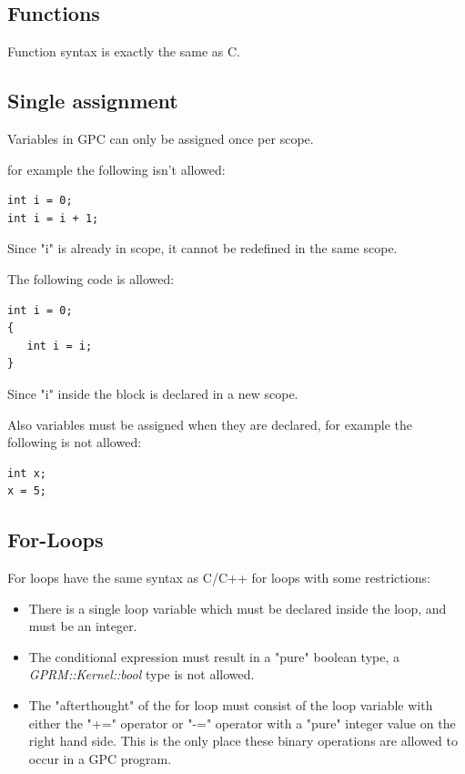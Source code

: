 \subsection{Functions}
        Function syntax is exactly the same as C. 


\subsection{Single assignment}
Variables in GPC can only be assigned once per scope.

for example the following isn't allowed:

\begin{lstlisting}[style=myGPC]
int i = 0;
int i = i + 1;
\end{lstlisting}

Since "i" is already in scope, it cannot be redefined in the same scope.

The following code is allowed:

\begin{lstlisting}[style=myGPC]
int i = 0;
{
   int i = i;
}
\end{lstlisting}

Since "i" inside the block is declared in a new scope.

Also variables must be assigned when they are declared, for example the following is not allowed:

\begin{lstlisting}[style=myGPC]
int x;
x = 5;
\end{lstlisting}

\subsection{For-Loops}
For loops have the same syntax as C/C++ for loops with some restrictions:

\begin{itemize}
\item There is a single loop variable which must be declared inside the loop, and must be an integer.

\item The conditional expression must result in a "pure" boolean type, a \textit{GPRM::Kernel::bool}
     type is not allowed.

\item The "afterthought" of the for loop must consist of the loop variable with either the "+=" operator
      or "-=" operator with a "pure" integer value on the right hand side. This is the only place these
      binary operations are allowed to occur in a GPC program. 

\end{itemize}

